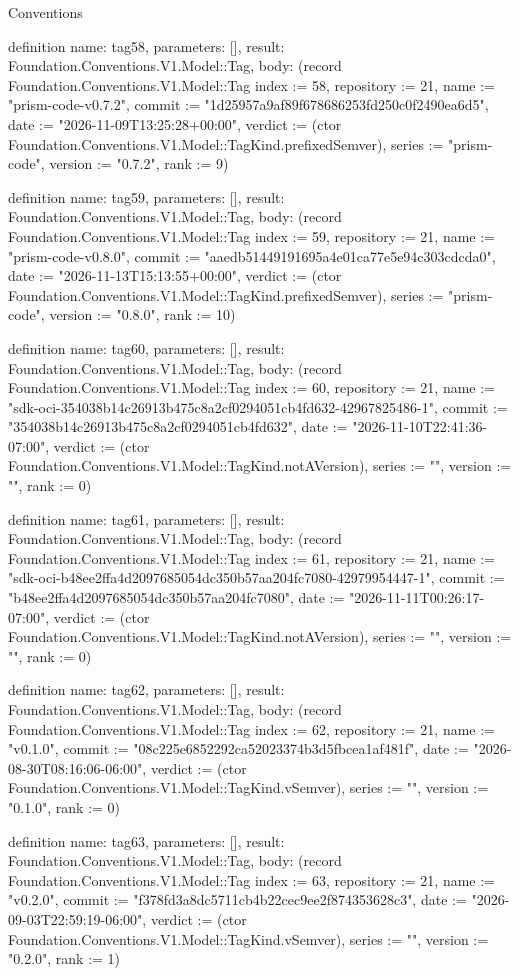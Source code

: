 \begin{lexlean}{Conventions}
\begin{semanticmodule}
definition{
  name: tag58,
  parameters: [],
  result: Foundation.Conventions.V1.Model::Tag,
  body: (record Foundation.Conventions.V1.Model::Tag {index := 58, repository := 21, name := "prism-code-v0.7.2", commit := "1d25957a9af89f678686253fd250c0f2490ea6d5", date := "2026-11-09T13:25:28+00:00", verdict := (ctor Foundation.Conventions.V1.Model::TagKind.prefixedSemver), series := "prism-code", version := "0.7.2", rank := 9})
}

definition{
  name: tag59,
  parameters: [],
  result: Foundation.Conventions.V1.Model::Tag,
  body: (record Foundation.Conventions.V1.Model::Tag {index := 59, repository := 21, name := "prism-code-v0.8.0", commit := "aaedb51449191695a4e01ca77e5e94c303cdcda0", date := "2026-11-13T15:13:55+00:00", verdict := (ctor Foundation.Conventions.V1.Model::TagKind.prefixedSemver), series := "prism-code", version := "0.8.0", rank := 10})
}

definition{
  name: tag60,
  parameters: [],
  result: Foundation.Conventions.V1.Model::Tag,
  body: (record Foundation.Conventions.V1.Model::Tag {index := 60, repository := 21, name := "sdk-oci-354038b14c26913b475c8a2cf0294051cb4fd632-42967825486-1", commit := "354038b14c26913b475c8a2cf0294051cb4fd632", date := "2026-11-10T22:41:36-07:00", verdict := (ctor Foundation.Conventions.V1.Model::TagKind.notAVersion), series := "", version := "", rank := 0})
}

definition{
  name: tag61,
  parameters: [],
  result: Foundation.Conventions.V1.Model::Tag,
  body: (record Foundation.Conventions.V1.Model::Tag {index := 61, repository := 21, name := "sdk-oci-b48ee2ffa4d2097685054dc350b57aa204fc7080-42979954447-1", commit := "b48ee2ffa4d2097685054dc350b57aa204fc7080", date := "2026-11-11T00:26:17-07:00", verdict := (ctor Foundation.Conventions.V1.Model::TagKind.notAVersion), series := "", version := "", rank := 0})
}

definition{
  name: tag62,
  parameters: [],
  result: Foundation.Conventions.V1.Model::Tag,
  body: (record Foundation.Conventions.V1.Model::Tag {index := 62, repository := 21, name := "v0.1.0", commit := "08c225e6852292ca52023374b3d5fbcea1af481f", date := "2026-08-30T08:16:06-06:00", verdict := (ctor Foundation.Conventions.V1.Model::TagKind.vSemver), series := "", version := "0.1.0", rank := 0})
}

definition{
  name: tag63,
  parameters: [],
  result: Foundation.Conventions.V1.Model::Tag,
  body: (record Foundation.Conventions.V1.Model::Tag {index := 63, repository := 21, name := "v0.2.0", commit := "f378fd3a8dc5711cb4b22cec9ee2f874353628c3", date := "2026-09-03T22:59:19-06:00", verdict := (ctor Foundation.Conventions.V1.Model::TagKind.vSemver), series := "", version := "0.2.0", rank := 1})
}


\end{semanticmodule}
\end{lexlean}
